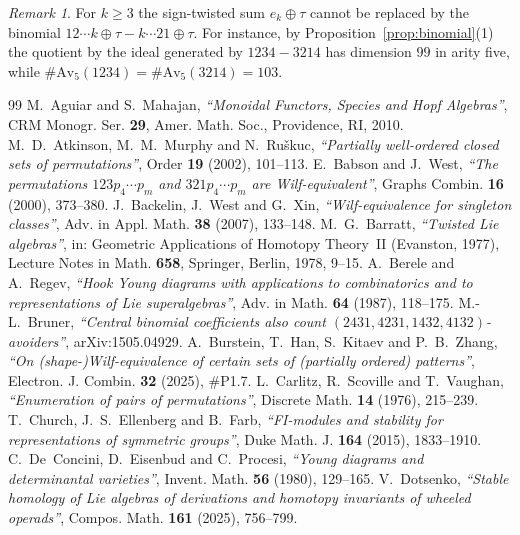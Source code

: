 \documentclass[11pt]{amsart}
\theoremstyle{definition}
\theoremstyle{remark}
\newtheorem{remark}[theorem]{Remark}
\newcommand{\Av}{\mathrm{Av}}
\begin{document}
\begin{remark}\label{rem:binomial-fails}
For $k\ge3$ the sign-twisted sum $e_k\oplus\tau$ cannot be replaced by the binomial $12\cdots k\oplus\tau-k\cdots21\oplus\tau$. For instance, by Proposition~\ref{prop:binomial}(1) the quotient by the ideal generated by $1234-3214$ has dimension $99$ in arity five, while $\#\Av_5(1234)=\#\Av_5(3214)=103$.
\end{remark}


\begin{thebibliography}{99}
 M.~Aguiar and S.~Mahajan, \textit{``Monoidal Functors, Species and Hopf Algebras''}, CRM Monogr. Ser. \textbf{29}, Amer. Math. Soc., Providence, RI, 2010.
 M.~D.~Atkinson, M.~M.~Murphy and N.~Ru\v{s}kuc, \textit{``Partially well-ordered closed sets of permutations''}, Order \textbf{19} (2002), 101--113.
 E.~Babson and J.~West, \textit{``The permutations $123p_4\cdots p_m$ and $321p_4\cdots p_m$ are Wilf-equivalent''}, Graphs Combin. \textbf{16} (2000), 373--380.
 J.~Backelin, J.~West and G.~Xin, \textit{``Wilf-equivalence for singleton classes''}, Adv. in Appl. Math. \textbf{38} (2007), 133--148.
 M.~G.~Barratt, \textit{``Twisted Lie algebras''}, in: Geometric Applications of Homotopy Theory~II (Evanston, 1977), Lecture Notes in Math. \textbf{658}, Springer, Berlin, 1978, 9--15.
 A.~Berele and A.~Regev, \textit{``Hook Young diagrams with applications to combinatorics and to representations of Lie superalgebras''}, Adv. in Math. \textbf{64} (1987), 118--175.
 M.-L.~Bruner, \textit{``Central binomial coefficients also count $(2431,4231,1432,4132)$-avoiders''}, arXiv:1505.04929.
 A.~Burstein, T.~Han, S.~Kitaev and P.~B.~Zhang, \textit{``On (shape-)Wilf-equivalence of certain sets of (partially ordered) patterns''}, Electron. J. Combin. \textbf{32} (2025), \#P1.7.
 L.~Carlitz, R.~Scoville and T.~Vaughan, \textit{``Enumeration of pairs of permutations''}, Discrete Math. \textbf{14} (1976), 215--239.
 T.~Church, J.~S.~Ellenberg and B.~Farb, \textit{``FI-modules and stability for representations of symmetric groups''}, Duke Math. J. \textbf{164} (2015), 1833--1910.
 C.~De~Concini, D.~Eisenbud and C.~Procesi, \textit{``Young diagrams and determinantal varieties''}, Invent. Math. \textbf{56} (1980), 129--165.
 V.~Dotsenko, \textit{``Stable homology of Lie algebras of derivations and homotopy invariants of wheeled operads''}, Compos. Math. \textbf{161} (2025), 756--799.

\end{thebibliography}
\end{document}

